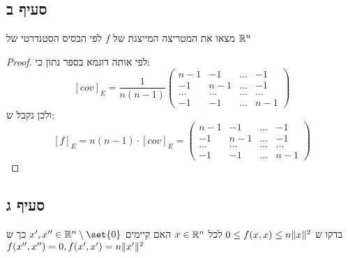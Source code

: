 \documentclass{article}
\DeclarePairedDelimiter\set\{\}
\begin{document}
    \subsection*{סעיף ב}
    מצאו את המטריצה המייצגת של $f$ לפי הבסיס הסטנדרטי של $\mathbb{R}^n$
    \begin{proof}
        לפי אותה דוגמא בספר נתון כי:
    \[
    [cov]_E = \frac{1}{n(n-1)}
    \begin{pmatrix}
        n-1    & -1     & \dotsc & -1 \\
        -1     & n-1    & \dotsc & -1 \\
        \dotsc & \dotsc & \dotsc & \dotsc \\
        -1     & -1     & \dotsc & n-1
    \end{pmatrix}
    \]
    ולכן נקבל ש:
    \[
    [f]_E = n(n-1) \cdot [cov]_E =
    \begin{pmatrix}
        n-1    & -1     & \dotsc & -1 \\
        -1     & n-1    & \dotsc & -1 \\
        \dotsc & \dotsc & \dotsc & \dotsc \\
        -1     & -1     & \dotsc & n-1
    \end{pmatrix}
    \]
    \end{proof}

    \pagebreak
    \subsection*{סעיף ג}
    בדקו ש \( 0 \leq f(x,x) \leq n \lVert x \rVert^2 \) לכל $x \in \mathbb{R}^n$ האם קיימים $x',x'' \in \RR^n \sub \set{0}$ כך ש
    \(f(x'', x'') = 0, f(x', x') = n \lVert x' \rVert^2\)
\end{document}

